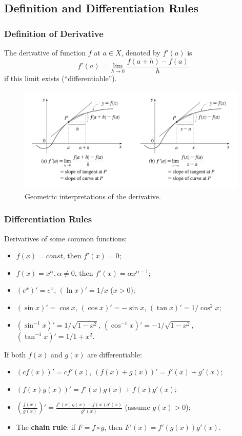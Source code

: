 \documentclass{beamer}
\begin{document}
\subsection{Definition and Differentiation Rules}
\begin{frame}
\frametitle{Definition of Derivative}
The derivative of function $f$ at $a\in X$, denoted by $f'(a)$ is
$$
f'(a) = \lim_{h \rightarrow 0} \frac{f(a+h)-f(a)}{h}
$$
if this limit exists (``differentiable'').
\vspace*{-0.1in}
\begin{figure}[H]
\centering
\includegraphics[width=11cm]{Derivative.png}
\vspace*{-0.15in}
\caption{Geometric interpretations of the derivative.}
\end{figure}

\end{frame}

\begin{frame}
\frametitle{Differentiation Rules}
Derivatives of some common functions:
\begin{itemize}
\item $f(x)=const$, then $f'(x)=0$;
\item $f(x) = x^{\alpha}, \alpha \neq 0$, then $f'(x) = \alpha x^{\alpha-1}$;
\item $(e^{x})'= e^{x}$, $(\ln x)' = 1/x$ ($x > 0$);
\item $(\sin x)' = \cos x$, $(\cos x)' = -\sin x$, $(\tan x)' = 1/\cos ^2 x$;
\item $(\sin^{-1} x)' = 1/\sqrt{1-x^2}$, $(\cos^{-1} x)' = -1/\sqrt{1-x^2}$, $(\tan^{-1} x)' = 1/{1+x^2}$.
\end{itemize}
If both $f(x)$ and $g(x)$ are differentiable:
\begin{itemize}
\item $(cf(x))' = cf'(x)$, $(f(x)+g(x))' = f'(x)+g'(x)$;
\item $(f(x)g(x))' = f'(x)g(x) + f(x)g'(x)$;
\item  $\left(\frac{f(x)}{g(x)} \right)'=\frac{f'(x)g(x) - f(x)g'(x)}{g^2(x)}$ (assume $g(x) > 0$);
\item The \textbf{chain rule}: if $F = f \circ g$, then $F'(x) = f'(g(x))g'(x)$.
\end{itemize}
\end{frame}
\end{document}
